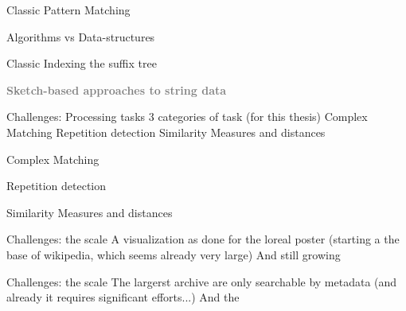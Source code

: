 \documentclass[aspectratio=169]{beamer}
\begin{document}
\begin{frame}{Classic Pattern Matching}

\end{frame}

\begin{frame}{Algorithms vs Data-structures}

\end{frame}

\begin{frame}{Classic Indexing the suffix tree}

\end{frame}

\begin{frame}
    \vfill
    \bigskip
    \begin{center}
        \textbf{\textcolor{gray}{Sketch-based approaches to   string data}}
    \end{center}
    \vfill
\end{frame}

\begin{frame}{Challenges: Processing tasks}
3 categories of task (for this thesis)
Complex Matching
Repetition detection
Similarity Measures and distances
\end{frame}

 \begin{frame}{Complex Matching}
    
 \end{frame}

 \begin{frame}{Repetition detection}
    
 \end{frame}

 \begin{frame}{Similarity Measures and distances}
    
 \end{frame}

\begin{frame}{Challenges: the scale}
    A visualization as done for the loreal poster (starting a the base of wikipedia, which seems already very large)
    And still growing
\end{frame}

\begin{frame}{Challenges: the scale}
    The largerst archive are only searchable by metadata (and already it requires significant efforts...)
    And the 
\end{frame}
\end{document}
